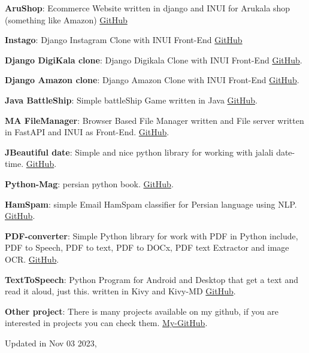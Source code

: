 \documentclass[margin]{res}
\begin{document}
\begin{resume}
\par
\textbf{AruShop}: 
Ecommerce Website written in django and INUI for Arukala shop (something like Amazon) \hfill \href{https://github.com/MohammadrezaAmani/arushop}{GitHub}
\par
\par
\textbf{Instago}: 
Django Instagram Clone with INUI Front-End \hfill \href{https://github.com/MohammadrezaAmani/Django-Instagram-clone}{GitHub}
\par
\textbf{Django DigiKala clone}: 
Django Digikala Clone with INUI Front-End \hfill \href{https://github.com/MohammadrezaAmani/Django-Digikala-clone}{GitHub}. 
\par
\textbf{Django Amazon clone}: 
Django Amazon Clone with INUI Front-End \hfill \href{https://github.com/MohammadrezaAmani/Django-Amazon-clone}{GitHub}. 
\par
\textbf{Java BattleShip}: 
Simple battleShip Game written in Java \hfill \href{https://github.com/MohammadrezaAmani/BattleShip}{GitHub}. 
\par
\textbf{MA FileManager}: 
Browser Based File Manager written and File server written in FastAPI and INUI as Front-End. \hfill \href{https://github.com/MohammadrezaAmani/FileManager}{GitHub}. 
\par
\textbf{JBeautiful date}: 
Simple and nice python library for working with jalali date-time.
 \hfill \href{https://github.com/MohammadrezaAmani/Jbeautiful-date}{GitHub}.
\par
\textbf{Python-Mag}: 
persian python book.
 \hfill \href{https://github.com/MohammadrezaAmani/PythonMag}{GitHub}.

\par
\textbf{HamSpam}: 
simple Email HamSpam classifier for Persian language using NLP.
 \hfill \href{https://github.com/MohammadrezaAmani/HamSpam}{GitHub}.

\par
\textbf{PDF-converter}:
Simple Python library for work with PDF in Python include, PDF to Speech, PDF to text, PDF to DOCx, PDF text Extractor and image OCR.
 \hfill \href{https://github.com/MohammadrezaAmani/pdf}{GitHub}.

\par
\textbf{TextToSpeech}: 
Python Program for Android and Desktop that get a text and read it aloud, just this. written in Kivy and Kivy-MD
 \hfill \href{https://github.com/MohammadrezaAmani/TextToSpeech-Kivy}{GitHub}.

\par
\textbf{Other project}: 
There is many projects available on my github, if you are interested in projects you can check them.
 \hfill \href{https://github.com/MohammadrezaAmani/}{My-GitHub}.


Updated in Nov 03 2023,   
\end{resume}
\end{document}
